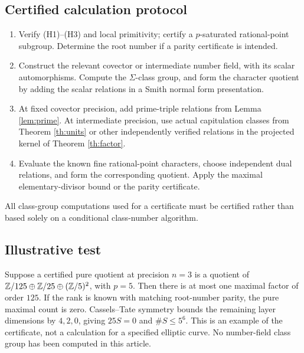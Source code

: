 \documentclass[11pt,a4paper]{article}
\theoremstyle{definition}\newtheorem{definition}[theorem]{Definition}
\theoremstyle{remark}\newtheorem{remark}[theorem]{Remark}
\numberwithin{equation}{section}
\begin{document}
\subsection*{Certified calculation protocol}
\begin{enumerate}
\item Verify (H1)--(H3) and local primitivity; certify a $p$-saturated rational-point subgroup. Determine the root number if a parity certificate is intended.
\item Construct the relevant covector or intermediate number field, with its scalar automorphisms. Compute the $\Sigma$-class group, and form the character quotient by adding the scalar relations in a Smith normal form presentation.
\item At fixed covector precision, add prime-triple relations from Lemma \ref{lem:prime}. At intermediate precision, use actual capitulation classes from Theorem \ref{th:units} or other independently verified relations in the projected kernel of Theorem \ref{th:factor}.
\item Evaluate the known fine rational-point characters, choose independent dual relations, and form the corresponding quotient. Apply the maximal elementary-divisor bound or the parity certificate.
\end{enumerate}
All class-group computations used for a certificate must be certified rather than based solely on a conditional class-number algorithm.

\subsection*{Illustrative test}
Suppose a certified pure quotient at precision $n=3$ is a quotient of $\mathbb Z/125\oplus\mathbb Z/25\oplus(\mathbb Z/5)^2$, with $p=5$. Then there is at most one maximal factor of order $125$. If the rank is known with matching root-number parity, the pure maximal count is zero. Cassels--Tate symmetry bounds the remaining layer dimensions by $4,2,0$, giving $25S=0$ and $\#S\le5^6$. This is an example of the certificate, not a calculation for a specified elliptic curve. No number-field class group has been computed in this article.
\end{document}
